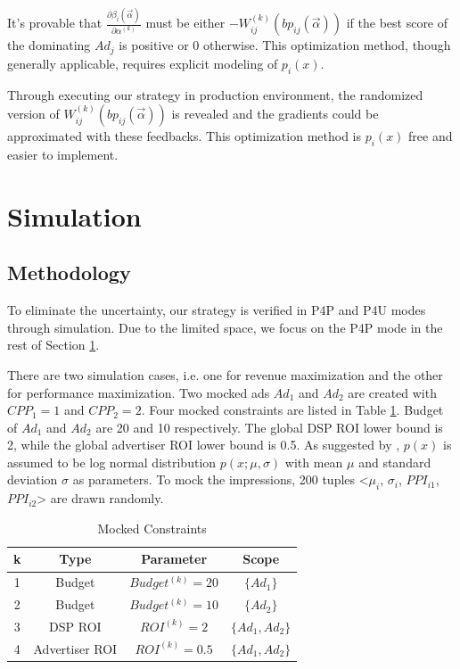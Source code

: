 \documentclass{article}
\newcommand{\sbp}{bp_{ij}}
\newcommand{\sW}{W_{ij}^{(k)}}
\newcommand{\salpha}{\alpha^{(k)}}
\newcommand{\sbeta}{\beta_i}
\newcommand{\valpha}{\vec{\alpha}}
\begin{document}
It's provable that $\frac{\partial\sbeta(\valpha)}{\partial\salpha}$ must be
    either $-\sW(\sbp(\valpha))$ if the best score of the dominating $Ad_j$ is positive or $0$ otherwise.
This optimization method, though generally applicable, requires explicit modeling of $p_i(x)$.

Through executing our strategy in production environment, the randomized version of $\sW(\sbp(\valpha))$ is revealed
    and the gradients could be approximated with these feedbacks.
This optimization method is $p_i(x)$ free and easier to implement.

\section{Simulation} \label{Simulation}

\subsection{Methodology}

To eliminate the uncertainty, our strategy is verified in P4P and P4U modes through simulation.
Due to the limited space, we focus on the P4P mode in the rest of Section \ref{Simulation}.

There are two simulation cases, i.e. one for revenue maximization and the other for performance maximization.
Two mocked ads $Ad_1$ and $Ad_2$ are created with $CPP_1=1$ and $CPP_2=2$.
Four mocked constraints are listed in Table \ref{TableConstraints}.
Budget of $Ad_1$ and $Ad_2$ are 20 and 10 respectively.
The global DSP ROI lower bound is 2, while the global advertiser ROI lower bound is 0.5.
As suggested by \cite{YingCui2011}, $p(x)$ is assumed to be log normal distribution $p(x;\mu,\sigma)$
    with mean $\mu$ and standard deviation $\sigma$ as parameters.
To mock the impressions, 200 tuples <$\mu_i$, $\sigma_i$, $PPI_{i1}$, $PPI_{i2}$> are drawn randomly.

\begin{table}
\caption{Mocked Constraints\label{TableConstraints}}
\begin{center}
\begin{tabular}{|c|c|c|c|}
\hline
k   & Type            & Parameter           & Scope   \\
\hline
1   & Budget          & $Budget^{(k)} = 20$ & $\{Ad_1\}$        \\
\hline
2   & Budget          & $Budget^{(k)} = 10$ & $\{Ad_2\}$        \\
\hline
3   & DSP ROI         & $ROI^{(k)} = 2$     & $\{Ad_1, Ad_2\}$  \\
\hline
4   & Advertiser ROI  & $ROI^{(k)} = 0.5$   & $\{Ad_1, Ad_2\}$  \\
\hline
\end{tabular}
\end{center}
\end{table}
\end{document}

